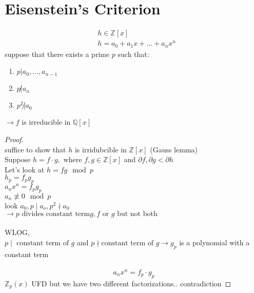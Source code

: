 \documentclass{article}
\begin{document}
\section{Eisenstein's Criterion}
\begin{align*}
&h \in \mathbb{Z}[x] \\
&h = a_0 + a_1 x + \dots + a_nx^n
\end{align*}
suppose that there exists a prime $p$ such that:
\begin{enumerate}
    \item $p | a_0, \dots, a_{n-1}$
    \item $p \not | a_n$
    \item $p^2 \not | a_0$
\end{enumerate}
$\rightarrow f$ is irreducible in $\mathbb{Q}[x]$
\begin{proof}
    \leavevmode \\ 
    suffice to show that $h$ is irridubcible in $\mathbb{Z}[x]$ (Gauss lemma) \\ 
    Suppose $h = f \cdot g,\text{ where }f,g \in \mathbb{Z} [x]$ and $\partial f, \partial g < \partial h$ \\ 
    Let's look at $h  = fg \mod p$ \\ 
    $h_p = f_p g_p$ \\ 
    $a_nx^n= f_p g_p$  \\ 
    $a_n \not \equiv 0 \mod p$ \\ 
    look $a_0, p \mid a_o, p^2\nmid a_0$
    \\ 
    $\rightarrow p \text{ divides constant term} g, f \text{ or } g \text{ but not both}$ \\ \\ 
    WLOG,  \\ 
    $p \mid \text{ constant term of }g$ and $p\nmid \text{constant term of } g \rightarrow g_p$ is a polynomial with a constant term \\ 
    \\ 
    $$a_nx^n =f_p \cdot g_p$$ 
    $\mathbb{Z}_p(x) $ UFD but we have two different factorizations.. contradiction
\end{proof}
 
\end{document}
